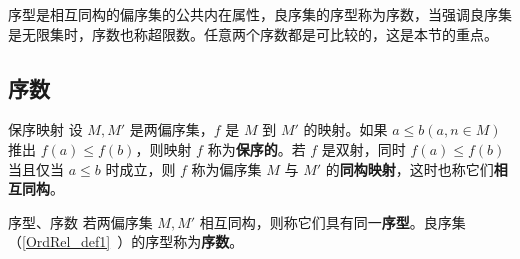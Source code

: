 序型是相互同构的偏序集的公共内在属性，良序集的序型称为序数，当强调良序集是无限集时，序数也称超限数。任意两个序数都是可比较的，这是本节的重点。
\subsection{序数}
\begin{definition}{保序映射}
设 $M,M'$ 是两偏序集，$f$ 是 $M$ 到 $M'$ 的映射。如果 $a\leq b(a,n\in M)$ 推出 $f(a)\leq f(b)$，则映射 $f$ 称为\textbf{保序的}。若 $f$ 是双射，同时 $f(a)\leq f(b)$ 当且仅当 $a\leq b$ 时成立，则 $f$ 称为偏序集 $M$ 与 $M'$ 的\textbf{同构映射}，这时也称它们\textbf{相互同构}。
\end{definition}
\begin{definition}{序型、序数}
若两偏序集 $M,M'$ 相互同构，则称它们具有同一\textbf{序型}。良序集（\autoref{OrdRel_def1}~）的序型称为\textbf{序数}。
\end{definition}
